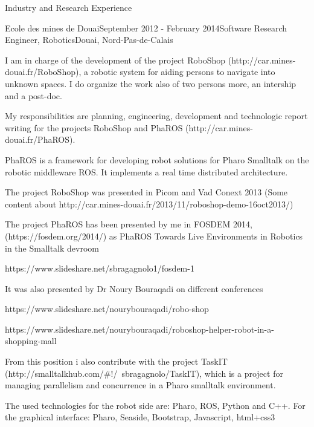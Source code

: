 \documentclass{resume} %
\begin{document}
\begin{rSection}{Industry and Research Experience}
\begin{rSubsection}{Ecole des mines de Douai}{September 2012 - February 2014}{Software Research Engineer, Robotics}{Douai, Nord-Pas-de-Calais}
\item I am in charge of the development of the project RoboShop (http://car.mines-douai.fr/RoboShop), a robotic system for aiding persons to navigate into unknown spaces. I do organize the work also of two persons more, an intership and a post-doc.  
\item My responsibilities are planning, engineering, development and technologic report writing for the projects RoboShop and PhaROS (http://car.mines-douai.fr/PhaROS). 
\item PhaROS is a framework for developing robot solutions for Pharo Smalltalk on the robotic middleware ROS. It implements a real time distributed architecture.
\item The project RoboShop was presented in Picom and Vad Conext 2013 (Some content about http://car.mines-douai.fr/2013/11/roboshop-demo-16oct2013/) 
\item The project PhaROS has been presented by me in FOSDEM 2014, (https://fosdem.org/2014/) as PhaROS Towards Live Environments in Robotics in the Smalltalk devroom
\item https://www.slideshare.net/sbragagnolo1/fosdem-1
\item It was also presented by Dr Noury Bouraqadi on different conferences
\item https://www.slideshare.net/nourybouraqadi/robo-shop
\item https://www.slideshare.net/nourybouraqadi/roboshop-helper-robot-in-a-shopping-mall
\item From this position i also contribute with the project TaskIT (http://smalltalkhub.com/\#!/~sbragagnolo/TaskIT), which is a project for managing parallelism and concurrence in a Pharo smalltalk environment.
\item The used technologies for the robot side are: Pharo, ROS, Python and C++. For the graphical interface: Pharo, Seaside, Bootstrap, Javascript, html+css3
\end{rSubsection}




\end{rSection}
\end{document}
